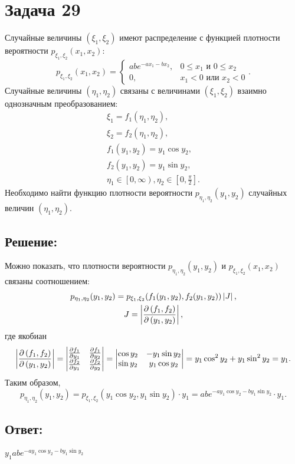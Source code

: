\documentclass[12pt]{article}
\begin{document}
    \section*{Задача 29}
    Случайные величины $\left ( \xi_1, \xi_2 \right )$ имеют распределение с функцией плотности вероятности $p_{\xi_1, \xi_2}(x_1, x_2)$:
    \[
        p_{\xi_1, \xi_2}(x_1, x_2)
        =
        \left \{
        \begin{array}{ll}
            a b e^{-a x_1 - b x_2}, & 0 \le x_1 \text{ и } 0 \le x_2 \\
            0,                      & x_1 < 0 \text{ или } x_2 < 0
        \end{array}
        \right .
        .
    \]
    Случайные величины $\left ( \eta_1, \eta_2 \right )$ связаны с величинами $\left ( \xi_1, \xi_2 \right )$ взаимно однозначным преобразованием:
    \begin{gather*}
        \xi_1 = f_1(\eta_1, \eta_2) , \\
        \xi_2 = f_2(\eta_1, \eta_2) , \\
        f_1(y_1, y_2) = y_1 \cos y_2 , \\
        f_2(y_1, y_2) = y_1 \sin y_2 , \\
        \eta_1 \in \left [ 0, \infty \right ), \eta_2 \in \left [ 0, \frac{\pi}{2} \right ] .
    \end{gather*}
    Необходимо найти функцию плотности вероятности $p_{\eta_1, \eta_2}(y_1, y_2)$ случайных величин $\left ( \eta_1, \eta_2 \right )$.

    \subsection*{Решение:}
    Можно показать, что плотности вероятности $p_{\eta_1, \eta_2}(y_1, y_2)$ и $p_{\xi_1, \xi_2}(x_1, x_2)$ связаны соотношением:
    \begin{gather*}
        p_{\eta_1, \eta_2}(y_1, y_2) = p_{\xi_1, \xi_2}(f_1(y_1, y_2), f_2(y_1, y_2)) \left | J \right |, \\
        J = \left | \frac{\partial \left ( {f_1, f_2} \right )}{\partial \left ( {y_1, y_2} \right )} \right | ,
    \end{gather*}
    где якобиан
    \[
        \left | \frac{\partial \left ( {f_1, f_2} \right )}{\partial \left ( {y_1, y_2} \right )} \right |
        = \begin{vmatrix}
              \frac{\partial f_1}{\partial y_1} & \frac{\partial f_1}{\partial y_2} \\
              \frac{\partial f_2}{\partial y_1} & \frac{\partial f_2}{\partial y_2}
        \end{vmatrix}
        = \begin{vmatrix}
              \cos y_2 & - y_1 \sin y_2 \\
              \sin y_2 & y_1 \cos y_2
        \end{vmatrix}
        = y_1 \cos^2 y_2 + y_1 \sin^2 y_2
        = y_1
        .
    \]
    Таким образом,
    \[
        p_{\eta_1, \eta_2}(y_1, y_2)
        = p_{\xi_1, \xi_2}(y_1 \cos y_2, y_1 \sin y_2) \cdot y_1
        = a b e^{-a y_1 \cos y_2 - b y_1 \sin y_2} \cdot y_1
        .
    \]

    \subsection*{Ответ:}
    $y_1 a b e^{-a y_1 \cos y_2 - b y_1 \sin y_2}$
\end{document}
